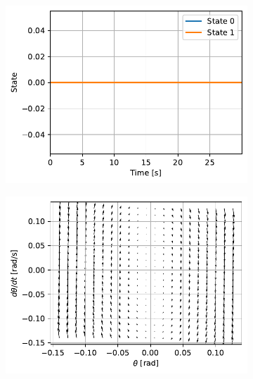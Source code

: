 \documentclass{cmc}
\begin{document}
\begin{figure}[H]
  \centering
  \begin{subfigure}[b]{0.49\textwidth}
    { \centering
      \includegraphics[width=\textwidth]{figures/Stable_case_state_(x0=[0dot0,_0dot0])}
      \label{fig:pendulum-stable-state}
    }
    \caption{}
  \end{subfigure}
  \begin{subfigure}[b]{0.49\textwidth}
    { \centering
      \includegraphics[width=\textwidth]{figures/Stable_case_phase_(x0=[0dot0,_0dot0])}
      \label{fig:pendulum-stable-phase}
    }
    \caption{}
  \end{subfigure}
  \caption{}
  \label{fig:pendulum-stable}
\end{figure}
\end{document}
